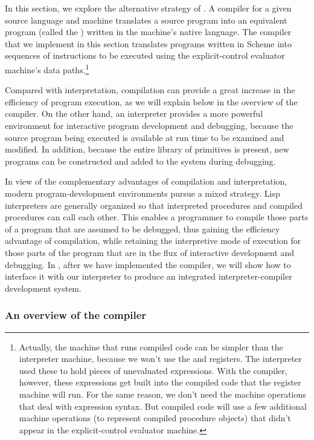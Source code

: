 In this section, we explore the alternative strategy of .
A compiler for a given source language and machine translates a source program
into an equivalent program (called the ) written in the
machine's native language.  The compiler that we implement in this section
translates programs written in Scheme into sequences of instructions to be
executed using the explicit-control evaluator machine's data
paths.\footnote{Actually, the machine that runs compiled code can be simpler
than the interpreter machine, because we won't use the  and
 registers.  The interpreter used these to hold pieces of
unevaluated expressions.  With the compiler, however, these expressions get
built into the compiled code that the register machine will run.  For the same
reason, we don't need the machine operations that deal with expression syntax.
But compiled code will use a few additional machine operations (to represent
compiled procedure objects) that didn't appear in the explicit-control
evaluator machine.}

Compared with interpretation, compilation can provide a great increase in the
efficiency of program execution, as we will explain below in the overview of
the compiler.  On the other hand, an interpreter provides a more powerful
environment for interactive program development and debugging, because the
source program being executed is available at run time to be examined and
modified.  In addition, because the entire library of primitives is present,
new programs can be constructed and added to the system during debugging.

In view of the complementary advantages of compilation and interpretation,
modern program-development environments pursue a mixed strategy.  Lisp
interpreters are generally organized so that interpreted procedures and
compiled procedures can call each other.  This enables a programmer to compile
those parts of a program that are assumed to be debugged, thus gaining the
efficiency advantage of compilation, while retaining the interpretive mode of
execution for those parts of the program that are in the flux of interactive
development and debugging.  In , after we have implemented
the compiler, we will show how to interface it with our interpreter to produce
an integrated interpreter-compiler development system.

\subsubsection*{An overview of the compiler}

